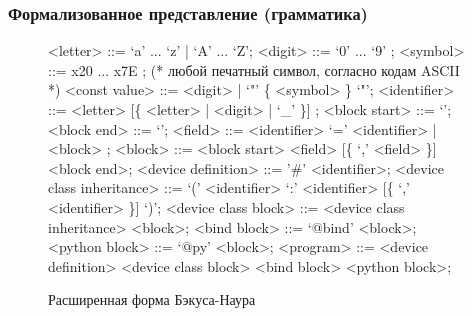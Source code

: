 \begin{frame}%
    \frametitle{Формализованное представление (грамматика)}
    \begin{figure}[!htbp]
        \begin{adjustbox}{max totalsize={\textwidth}{\textheight}}
            \begin{minipage}{\linewidth}
                \begin{grammar}
                    <letter> ::= `a' ... `z' | `A' ... `Z'; \newline
                    <digit> ::= `0' ... `9' ; \newline
                    <symbol> ::= x20 ... x7E ; (* любой печатный символ, согласно кодам ASCII *) \newline
                    <const value> ::= <digit> | `"' \{ <symbol> \} `"'; \newline
                    <identifier> ::= <letter> [\{ <letter> | <digit> | `\_' \}] ; \newline
                    <block start> ::= `{'; \newline
                    <block end> ::= `}'; \newline
                    <field> ::= <identifier> `=' <identifier> | <block> ; \newline
                    <block> ::= <block start> <field> [\{ `,' <field> \}] <block end>; \newline
                    <device definition> ::= '\#' <identifier>; \newline
                    <device class inheritance> ::= `(' <identifier> `:' <identifier> [\{ `,' <identifier> \}] `)'; \newline
                    <device class block> ::= <device class inheritance> <block>; \newline
                    <bind block> ::= `@bind' <block>; \newline
                    <python block> ::= `@py' <block>; \newline
                    <program> ::= <device definition> <device class block> <bind block> <python block>;
                \end{grammar}
            \end{minipage}
        \end{adjustbox}
        \caption{Расширенная форма Бэкуса-Наура \mylanguage}\label{fig:qpydev-grammar}
    \end{figure}
\end{frame}


